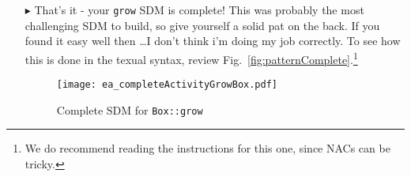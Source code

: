 \begin{itemize}
\item[$\blacktriangleright$]  That's it - your \texttt{grow} SDM is complete! This was probably the most challenging SDM to build, so give yourself a solid 
pat on the back. If you found it easy well then \ldots I don't think i'm doing my job correctly. To see how this is done in the texual syntax, review
Fig.~\ref{fig:patternComplete}.\footnote{We do recommend reading the instructions for this one, since NACs can be tricky.}

\newpage
\vspace*{3cm}

\begin{figure}[htbp]
\begin{center}
  \texttt{[image: ea\_completeActivityGrowBox.pdf]}
  \caption{Complete SDM for \texttt{Box::grow}}  
  \label{fig:sdm_grow_5}
\end{center}
\end{figure}
\FloatBarrier


\end{itemize}
